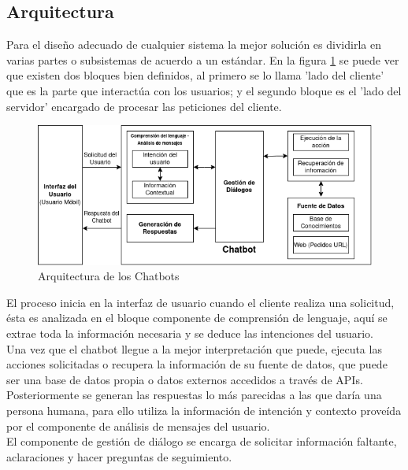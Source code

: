 \subsection{Arquitectura} 
Para el diseño adecuado de cualquier sistema la mejor solución es dividirla en varias partes o subsistemas de acuerdo a un estándar.
En la figura \ref{fig:Arquitectura} se puede ver que existen dos bloques bien definidos, al primero se lo llama 'lado del cliente' que es la parte que interactúa con los usuarios; y el segundo bloque es el 'lado del servidor' encargado de procesar las peticiones del cliente.\\
\begin{figure}[h]
    \centering
    \includegraphics[width=\textwidth]{imagenes/Cap 2/Arquitectura.png}
    \caption{Arquitectura de los Chatbots}
    \label{fig:Arquitectura}
\end{figure}
\indent El  proceso inicia en la interfaz de usuario cuando el cliente realiza una solicitud, ésta es analizada en el bloque componente de comprensión de lenguaje, aquí se extrae toda la información necesaria y se deduce las intenciones del usuario.\\
\indent Una vez que el chatbot llegue a la mejor interpretación que puede, ejecuta las acciones solicitadas o recupera la información de su fuente de datos, que puede ser una base de datos propia o datos externos accedidos a través de APIs.\\
\indent Posteriormente se generan las respuestas lo más parecidas a las que daría una persona humana, para ello utiliza la información de intención y contexto proveída por el componente de análisis de mensajes del usuario.\\
\indent El componente de gestión de diálogo se encarga de solicitar información faltante, aclaraciones y hacer preguntas de seguimiento.\cite{Overview_of_chatbots}


